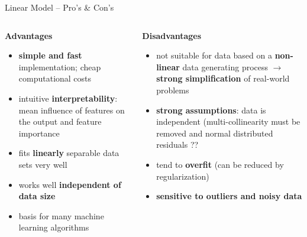\documentclass[11pt,compress,t,notes=noshow, xcolor=table]{beamer}
\newcommand{\highlight}[1]{\textcolor{highlightcol}{\textbf{#1}}}
\newcommand{\positem}{\item[$\highlight{+}$]}
\newcommand{\negitem}{\item[$\highlight{-}$]}
\begin{document}
\begin{frame}{Linear Model -- Pro's \& Con's}

\footnotesize

\begin{columns}[onlytextwidth]
  \begin{column}{0.5\textwidth}
    \highlight{Advantages}
    \footnotesize
    \begin{itemize}
      \positem \textbf{simple and fast} implementation; cheap computational costs
      \positem intuitive \textbf{interpretability}: mean influence of features on the output and feature importance
      \positem fits \textbf{linearly} separable data sets very well
      \positem works well \textbf{independent of data size}
      \positem basis for many machine learning algorithms

    \end{itemize}
  \end{column}

  \begin{column}{0.5\textwidth}
    \highlight{Disadvantages}
    \footnotesize
    \begin{itemize}
      \negitem not suitable for data based on a \textbf{non-linear} data generating process $\rightarrow$ \textbf{strong simplification} of real-world problems
      
      \negitem \textbf{strong assumptions}: data is independent (multi-collinearity must be removed and normal distributed residuals ??
      
      \negitem tend to \textbf{overfit} (can be reduced by regularization)
      
      \negitem \textbf{sensitive to outliers and noisy data}
    \end{itemize}
  \end{column}
\end{columns}

\vfill

\small


\end{frame}

\end{document}
